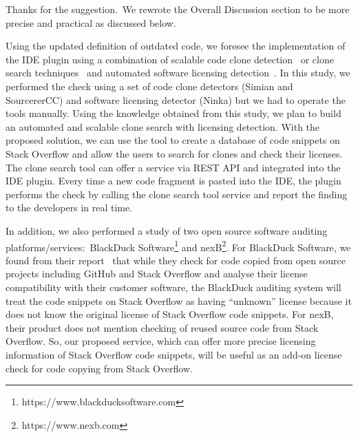 \documentclass[a4paper,twoside,10pt]{reviewresponse}
\begin{document}

Thanks for the suggestion.~We rewrote the Overall Discussion section to be more precise and practical as discussed below. 

Using the updated definition of outdated code, we foresee the implementation of the IDE plugin using a combination of scalable code clone detection~\citep{Sajnani2016} or clone search techniques~\citep{Kim2018} and automated software licensing detection~\citep{German2010}.
In this study, we performed the check using a set of code clone detectors (Simian and SourcererCC) and software licensing detector (Ninka) but we had to operate the tools manually. Using the knowledge obtained from this study, we plan to build an automated and scalable clone search with licensing detection. With the proposed solution, we can use the tool to create a database of code snippets on Stack Overflow and allow the users to search for clones and check their licenses. The clone search tool can offer a service via REST API and integrated into the IDE plugin. Every time a new code fragment is pasted into the IDE, the plugin performs the check by calling the clone search tool service and report the finding to the developers in real time.

In addition, we also performed a study of two open source software auditing platforms/services:~BlackDuck Software\footnote{https://www.blackducksoftware.com} and nexB\footnote{https://www.nexb.com}. For BlackDuck Software, we found from their report~\citep{CORSI2017} that while they check for code copied from open source projects including GitHub and Stack Overflow and analyse their license compatibility with their customer software, the BlackDuck auditing system will treat the code snippets on Stack Overflow as having ``unknown'' license because it does not know the original license of Stack Overflow code snippets. For nexB, their product does not mention checking of reused source code from Stack Overflow. So, our proposed service, which can offer more precise licensing information of Stack Overflow code snippets, will be useful as an add-on license check for code copying from Stack Overflow.
\end{document}
